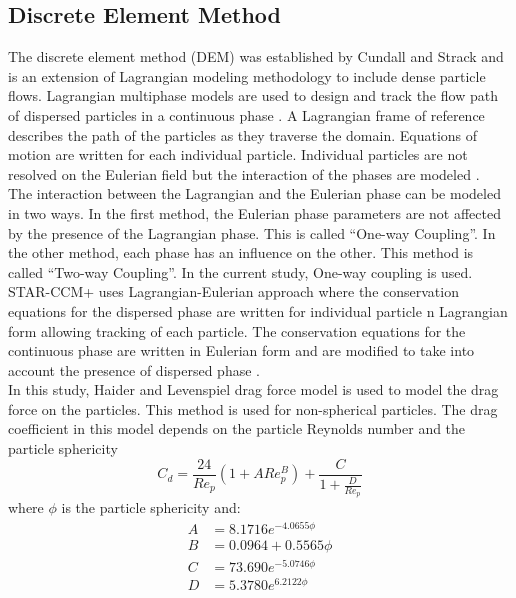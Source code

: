 \subsection{Discrete Element Method}
The discrete element method (DEM) was established by Cundall and Strack \cite{Reference10} and is an extension of Lagrangian modeling methodology to include dense particle flows. Lagrangian multiphase models are used to design and track the flow path of dispersed particles in a continuous phase \cite{Lagrangian}. A Lagrangian frame of reference describes the path of the particles as they traverse the domain. Equations of motion are written for each individual particle. Individual particles are not resolved on the Eulerian field but the interaction of the phases are modeled \cite{Lagrangian}.\\
The interaction between the Lagrangian and the Eulerian phase can be modeled in two ways. In the first method, the Eulerian phase parameters are not affected by the presence of the Lagrangian phase. This is called ``One-way Coupling''. In the other method, each phase has an influence on the other. This method is called ``Two-way Coupling''. In the current study, One-way coupling is used.\\
STAR-CCM+ uses Lagrangian-Eulerian approach where the conservation equations for the dispersed phase are written for individual particle n Lagrangian form allowing tracking of each particle. The conservation equations for the continuous phase are written in Eulerian form and are modified to take into account the presence of dispersed phase \cite{Lagrangian}.\\
In this study, Haider and Levenspiel drag force model is used to model the drag force on the particles. This method is used for non-spherical particles. The drag coefficient in this model depends on the particle Reynolds number and the particle sphericity \cite{Lagrangian}
\begin{equation}
C_d = \frac{24}{Re_p} (1 + ARe_p^B) + \frac{C}{1 + \frac{D}{Re_p}} \label{Drag Coeff eq}
\end{equation}
where $\phi$ is the particle sphericity and:
\begin{align*}
A &= 8.1716e^{-4.0655\phi}\\
B &= 0.0964+0.5565\phi\\
C &= 73.690e^{−5.0746\phi}\\
D &= 5.3780e^{6.2122\phi}\\
\end{align*}
